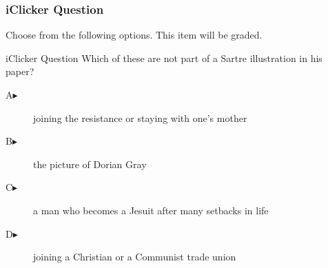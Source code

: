 \begin{frame}
  \frametitle{iClicker Question}
Choose from the following options. This item will be graded.
\begin{block}{iClicker Question}
Which of these are not part of a Sartre illustration in his paper?
\end{block}
\begin{description}
\item[A\hspace{.2in}$\blacktriangleright$] joining the resistance or staying with one's mother
\item[B\hspace{.2in}$\blacktriangleright$] the picture of Dorian Gray
\item[C\hspace{.2in}$\blacktriangleright$] a man who becomes a Jesuit after many setbacks in life
\item[D\hspace{.2in}$\blacktriangleright$] joining a Christian or a Communist trade union
\end{description}
\end{frame}
